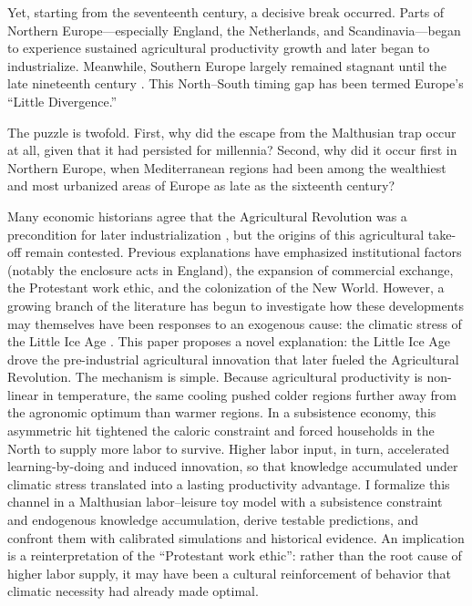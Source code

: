 \documentclass[11pt,a4paper]{article}
\begin{document}
Yet, starting from the seventeenth century, a decisive break occurred. Parts of Northern Europe---especially England, the Netherlands, and Scandinavia---began to experience sustained agricultural productivity growth and later began to industrialize. Meanwhile, Southern Europe largely remained stagnant until the late nineteenth century \parencite{Malanima2011, OlssonSvensson2010, Allen2000}. This North--South timing gap has been termed Europe's ``Little Divergence.''

The puzzle is twofold. First, why did the escape from the Malthusian trap occur at all, given that it had persisted for millennia? Second, why did it occur first in Northern Europe, when Mediterranean regions had been among the wealthiest and most urbanized areas of Europe as late as the sixteenth century? 

Many economic historians agree that the Agricultural Revolution was a precondition for later industrialization \parencite{Overton1996}, but the origins of this agricultural take-off remain contested.
Previous explanations have emphasized institutional factors (notably the enclosure acts in England), the expansion of commercial exchange, the Protestant work ethic, and the colonization of the New World. However, a growing branch of the literature has begun to investigate how these developments may themselves have been responses to an exogenous cause: the climatic stress of the Little Ice Age \parencite{Parker2013, Waldinger2022}.
This paper proposes a novel explanation: the Little Ice Age drove the pre-industrial agricultural innovation that later fueled the Agricultural Revolution. The mechanism is simple. Because agricultural productivity is non-linear in temperature, the same cooling pushed colder regions further away from the agronomic optimum than warmer regions. In a subsistence economy, this asymmetric hit tightened the caloric constraint and forced households in the North to supply more labor to survive. Higher labor input, in turn, accelerated learning-by-doing and induced innovation, so that knowledge accumulated under climatic stress translated into a lasting productivity advantage.
I formalize this channel in a Malthusian labor--leisure toy model with a subsistence constraint and endogenous knowledge accumulation, derive testable predictions, and confront them with calibrated simulations and historical evidence. An implication is a reinterpretation of the ``Protestant work ethic'': rather than the root cause of higher labor supply, it may have been a cultural reinforcement of behavior that climatic necessity had already made optimal.
\end{document}
